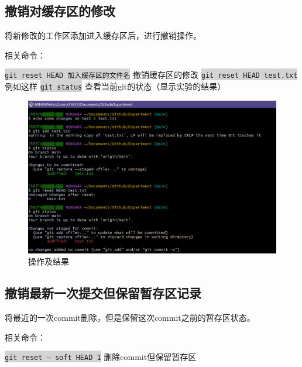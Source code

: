 \documentclass[a4paper, 12pt]{article}
\begin{document}
\clearpage

  \subsection{撤销对缓存区的修改}

将新修改的工作区添加进入缓存区后，进行撤销操作。

相关命令：

\colorbox{lightgray}{\texttt{git reset HEAD 加入缓存区的文件名}} 撤销缓存区的修改
\colorbox{lightgray}{\texttt{git reset HEAD test.txt}} 例如这样
\colorbox{lightgray}{\texttt{git status}} 查看当前git的状态（显示实验的结果）

\begin{figure}[h!]
  \centering
  \includegraphics[width=1\textwidth]{im13}
  \caption{操作及结果}
  \label{image-myimage}
\end{figure}

\clearpage

  \subsection{撤销最新一次提交但保留暂存区记录}

将最近的一次commit删除，但是保留这次commit之前的暂存区状态。

相关命令：

\colorbox{lightgray}{\texttt{git reset -- soft HEAD~1}} 删除commit但保留暂存区
\end{document}
